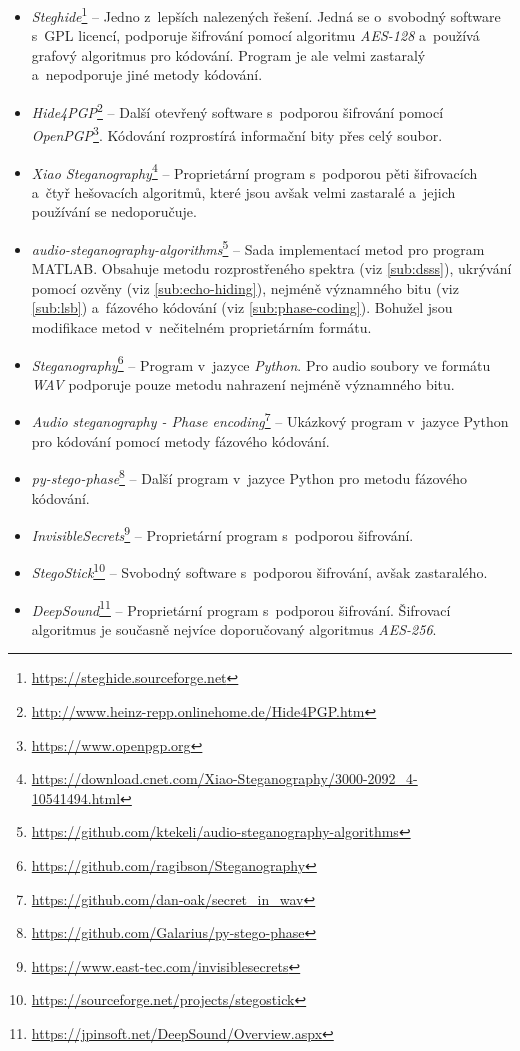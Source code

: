 \begin{itemize}
    \item \textit{Steghide}\footnote{\url{https://steghide.sourceforge.net}} --
        Jedno z~lepších nalezených řešení. Jedná se o~svobodný software s~GPL
        licencí, podporuje šifrování pomocí algoritmu \textit{AES-128}
        a~používá grafový algoritmus pro kódování. Program je ale velmi
        zastaralý a~nepodporuje jiné metody kódování.
    \item \textit{Hide4PGP}\footnote{\url{http://www.heinz-repp.onlinehome.de/Hide4PGP.htm}}
        -- Další otevřený software s~podporou šifrování pomocí
        \textit{OpenPGP}\footnote{\url{https://www.openpgp.org}}. Kódování
        rozprostírá informační bity přes celý soubor.
    \item \textit{Xiao Steganography}\footnote{\url{https://download.cnet.com/Xiao-Steganography/3000-2092_4-10541494.html}}
        -- Proprietární program s~podporou pěti šifrovacích a~čtyř hešovacích
        algoritmů, které jsou avšak velmi zastaralé a~jejich používání se
        nedoporučuje.
    \item \textit{audio-steganography-algorithms}\footnote{\url{https://github.com/ktekeli/audio-steganography-algorithms}}
        -- Sada implementací metod pro program MATLAB. Obsahuje metodu
        rozprostřeného spektra (viz \ref{sub:dsss}), ukrývání pomocí ozvěny
        (viz \ref{sub:echo-hiding}), nejméně významného bitu (viz
        \ref{sub:lsb}) a~fázového kódování (viz \ref{sub:phase-coding}).
        Bohužel jsou modifikace metod v~nečitelném proprietárním formátu.
    \item \textit{Steganography}\footnote{\url{https://github.com/ragibson/Steganography}}
        -- Program v~jazyce \textit{Python}. Pro audio soubory ve formátu
        \textit{WAV} podporuje pouze metodu nahrazení nejméně významného bitu.
    \item \textit{Audio steganography - Phase encoding}\footnote{\url{https://github.com/dan-oak/secret_in_wav}}
        -- Ukázkový program v~jazyce Python pro kódování pomocí metody fázového
        kódování.
    \item \textit{py-stego-phase}\footnote{\url{https://github.com/Galarius/py-stego-phase}}
        -- Další program v~jazyce Python pro metodu fázového kódování.
    \item \textit{InvisibleSecrets}\footnote{\url{https://www.east-tec.com/invisiblesecrets}}
        -- Proprietární program s~podporou šifrování.
    \item \textit{StegoStick}\footnote{\url{https://sourceforge.net/projects/stegostick}}
        -- Svobodný software s~podporou šifrování, avšak zastaralého.
    \item \textit{DeepSound}\footnote{\url{https://jpinsoft.net/DeepSound/Overview.aspx}}
        -- Proprietární program s~podporou šifrování. Šifrovací algoritmus je
        současně nejvíce doporučovaný algoritmus \textit{AES-256}.
\end{itemize}

